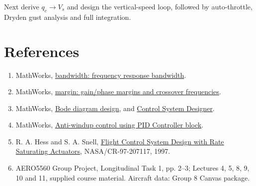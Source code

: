 \documentclass[a4paper,11pt]{article}
\begin{document}
Next derive $q_c\rightarrow V_s$ and design the vertical-speed loop, followed by auto-throttle, Dryden gust analysis and full integration.

\section*{References}
\begin{enumerate}
\item MathWorks, \href{https://www.mathworks.com/help/control/ref/dynamicsystem.bandwidth.html}{bandwidth: frequency response bandwidth}.
\item MathWorks, \href{https://www.mathworks.com/help/control/ref/dynamicsystem.margin.html}{margin: gain/phase margins and crossover frequencies}.
\item MathWorks, \href{https://www.mathworks.com/help/control/ug/bode-diagram-design.html}{Bode diagram design}, and \href{https://www.mathworks.com/help/control/ref/controlsystemdesigner-app.html}{Control System Designer}.
\item MathWorks, \href{https://www.mathworks.com/help/simulink/slref/anti-windup-control-using-a-pid-controller.html}{Anti-windup control using PID Controller block}.
\item R. A. Hess and S. A. Snell, \href{https://ntrs.nasa.gov/citations/19980017538}{Flight Control System Design with Rate Saturating Actuators}, NASA/CR-97-207117, 1997.
\item AERO5560 Group Project, Longitudinal Task 1, pp. 2--3; Lectures 4, 5, 8, 9, 10 and 11, supplied course material. Aircraft data: Group 8 Canvas package.
\end{enumerate}
\end{document}
